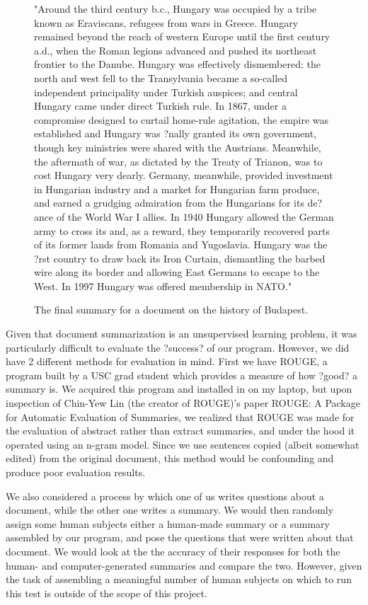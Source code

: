 \documentclass[12pt]{article}
\theoremstyle{plain}
\theoremstyle{definition}
\theoremstyle{remark}
\theoremstyle{plain}
\begin{document}
\begin{figure}
	
"Around the third century b.c., Hungary was occupied by a tribe known as Eraviscans, refugees from wars in Greece. Hungary remained beyond the reach of western Europe until the first century a.d., when the Roman legions advanced and pushed its northeast frontier to the Danube. Hungary was effectively dismembered: the north and west fell to the Transylvania became a so-called independent principality under Turkish auspices; and central Hungary came under direct Turkish rule. In 1867, under a compromise designed to curtail home-rule agitation, the empire was established and Hungary was ?nally granted its own government, though key ministries were shared with the Austrians. Meanwhile, the aftermath of war, as dictated by the Treaty of Trianon, was to cost Hungary very dearly. Germany, meanwhile, provided investment in Hungarian industry and a market for Hungarian farm produce, and earned a grudging admiration from the Hungarians for its de?ance of the World War I allies. In 1940 Hungary allowed the German army to cross its and, as a reward, they temporarily recovered parts of its former lands from Romania and Yugoslavia. Hungary was the ?rst country to draw back its Iron Curtain, dismantling the barbed wire along its border and allowing East Germans to escape to the West. In 1997 Hungary was offered membership in NATO."
\caption{The final summary for a document on the history of Budapest.}\label{goodsummary}
\end{figure}
 


	Given that document summarization is an unsupervised learning problem, it was particularly difficult to evaluate the ?success? of our program. However, we did have 2 different methods for evaluation in mind. First we have ROUGE, a program built by a USC grad student which provides a measure of how ?good? a summary is. We acquired this program and installed in on my laptop, but upon inspection of Chin-Yew Lin (the creator of ROUGE)'s paper ROUGE: A Package for Automatic Evaluation of Summaries, we realized that ROUGE was made for the evaluation of abstract rather than extract summaries, and under the hood it operated using an n-gram model. Since we use sentences copied (albeit somewhat edited) from the original document, this method would be confounding and produce poor evaluation results.
	
We also considered a process by which one of us writes questions about a document, while the other one writes a summary. We would then randomly assign some human subjects either a human-made summary or a summary assembled by our program, and pose the questions that were written about that document. We would look at the the accuracy of their responses for both the human- and computer-generated summaries and compare the two. However, given the task of assembling a meaningful number of human subjects on which to run this test is outside of the scope of this project.
\end{document}
